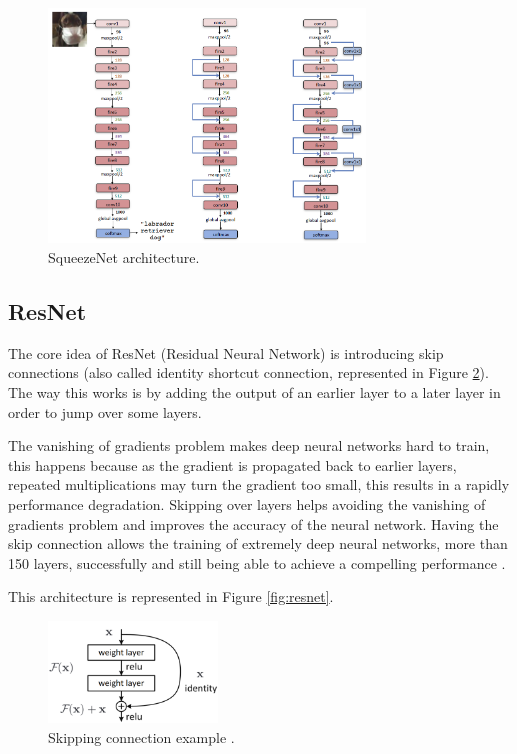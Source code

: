    \begin{figure}[H]
    \centering
    \captionsetup{justification=centering}
    \includegraphics[width=0.75\textwidth]{Sections/2StateOfTheArt/2_images/squezeeNetArchitecture.png}
    \caption[SqueezeNet architecture.]{SqueezeNet architecture. \cite{squeezenetweb}} 
    \label{fig:squezeenet}
\end{figure}


  
    

    \subsection{ResNet}

    The core idea of ResNet (Residual Neural Network) is introducing skip connections (also called identity shortcut connection, represented in Figure \ref{fig:skip}). The way this works is by adding the output of an earlier layer to a later layer in order to jump over some layers. \par

    The vanishing of gradients problem makes deep neural networks hard to train, this happens because as the gradient is propagated back to earlier layers, repeated multiplications may turn the gradient too small, this results in a rapidly performance degradation. Skipping over layers helps avoiding the vanishing of gradients problem and improves the accuracy of the neural network. Having the skip connection allows the training of extremely deep neural networks, more than 150 layers, successfully and still being able to achieve a compelling performance \cite{He2016}.

    This architecture is represented in Figure \ref{fig:resnet}.
    \begin{figure}[H]
        \centering
        \captionsetup{justification=centering}
        \includegraphics[width=0.4\textwidth]{Sections/2StateOfTheArt/2_images/resnet_block.png}
        \caption[Skipping connection example]{Skipping connection example \cite{He2016}.} 
        \label{fig:skip}
    \end{figure}

